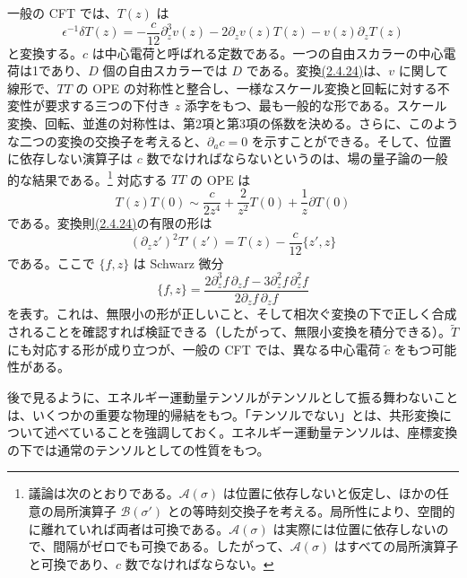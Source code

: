 一般の CFT では、$T(z)$ は
\begin{equation}
\epsilon^{-1}\delta T(z)
=-\frac c{12}\partial_z^3v(z)
-2\partial_zv(z)T(z)-v(z)\partial_zT(z)
\tag{2.4.24}\label{eq:2.4.24}
\end{equation}
と変換する。$c$ は中心電荷と呼ばれる定数である。一つの自由スカラーの中心電荷は1であり、$D$ 個の自由スカラーでは $D$ である。変換\hyperref[eq:2.4.24]{(2.4.24)}は、$v$ に関して線形で、$TT$ の OPE の対称性と整合し、一様なスケール変換と回転に対する不変性が要求する三つの下付き $z$ 添字をもつ、最も一般的な形である。スケール変換、回転、並進の対称性は、第2項と第3項の係数を決める。さらに、このような二つの変換の交換子を考えると、$\partial_ac=0$ を示すことができる。そして、位置に依存しない演算子は $c$ 数でなければならないというのは、場の量子論の一般的な結果である。\footnote[5]{議論は次のとおりである。$\mathcal A(\sigma)$ は位置に依存しないと仮定し、ほかの任意の局所演算子 $\mathcal B(\sigma')$ との等時刻交換子を考える。局所性により、空間的に離れていれば両者は可換である。$\mathcal A(\sigma)$ は実際には位置に依存しないので、間隔がゼロでも可換である。したがって、$\mathcal A(\sigma)$ はすべての局所演算子と可換であり、$c$ 数でなければならない。}
対応する $TT$ の OPE は
\begin{equation}
T(z)T(0)\sim\frac c{2z^4}+\frac2{z^2}T(0)+\frac1z\partial T(0)
\tag{2.4.25}\label{eq:2.4.25}
\end{equation}
である。変換則\hyperref[eq:2.4.24]{(2.4.24)}の有限の形は
\begin{equation}
(\partial_z z')^2T'(z')=T(z)-\frac c{12}\{z',z\}
\tag{2.4.26}\label{eq:2.4.26}
\end{equation}
である。ここで $\{f,z\}$ は Schwarz 微分
\begin{equation}
\{f,z\}=\frac{2\partial_z^3f\,\partial_zf
-3\partial_z^2f\,\partial_z^2f}
{2\partial_zf\,\partial_zf}
\tag{2.4.27}\label{eq:2.4.27}
\end{equation}
を表す。これは、無限小の形が正しいこと、そして相次ぐ変換の下で正しく合成されることを確認すれば検証できる（したがって、無限小変換を積分できる）。$\widetilde T$ にも対応する形が成り立つが、一般の CFT では、異なる中心電荷 $\tilde c$ をもつ可能性がある。

後で見るように、エネルギー運動量テンソルがテンソルとして振る舞わないことは、いくつかの重要な物理的帰結をもつ。「テンソルでない」とは、共形変換について述べていることを強調しておく。エネルギー運動量テンソルは、座標変換の下では通常のテンソルとしての性質をもつ。

\label{sec:2.5}

